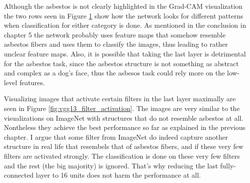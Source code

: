 \begin{figure}[H]
\label{fig:asbestos_gradcam}
\end{figure}

Although the asbestos is not clearly highlighted in the Grad-CAM visualization the two rows seen in Figure \ref{fig:asbestos_gradcam} show how the network looks for different patterns when classification for either category is done. As mentioned in the conclusion in chapter 5 the network probably uses feature maps that somehow resemble asbestos fibers and uses them to classify the images, thus leading to rather unclear feature maps. Also, it is possible that taking the last layer is detrimental for the asbestos task, since the asbestos structure is not something as abstract and complex as a dog's face, thus the asbesos task could rely more on the low-level features. 

Visualizing images that activate certain filters in the last layer maximally are seen in Figure \ref{fig:vgg13_filter_activation}. The images are very similar to the visualizations on ImageNet with structures that do not resemble asbestos at all. Nontheless they achieve the best performance so far as explained in the previous chapter. I argue that some filter from ImageNet do indeed capture another structure in real life that resembels that of asbestos fibers, and if these very few filters are activated strongly. The classification is done on these very few filters and the rest (the big majority) is ignored. That's why reducing the last fully-connected layer to 16 units does not harm the performance at all.


